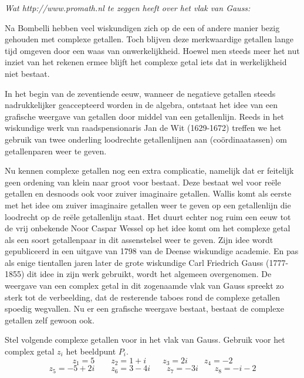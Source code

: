 \documentclass[12pt,twoside,a4]{article}
\begin{document}
\vspace*{1cm}
\begin{mdframed}%
{\em Wat http://www.promath.nl te zeggen heeft over het vlak van Gauss:}

Na Bombelli hebben veel wiskundigen zich op de een of andere manier bezig gehouden met complexe getallen. Toch blijven deze merkwaardige getallen lange tijd omgeven door een waas van onwerkelijkheid. Hoewel men steeds meer het nut inziet van het rekenen ermee blijft het complexe getal iets dat in werkelijkheid niet bestaat.

In het begin van de zeventiende eeuw, wanneer de negatieve getallen steeds nadrukkelijker geaccepteerd worden in de algebra, ontstaat het idee van een grafische weergave van getallen door middel van een getallenlijn. Reeds in het wiskundige werk van raadspensionaris Jan de Wit (1629-1672) treffen we het gebruik van twee onderling loodrechte getallenlijnen aan (coördinaatassen) om getallenparen weer te geven.

Nu kennen complexe getallen nog een extra complicatie, namelijk dat er feitelijk geen ordening van klein naar groot voor bestaat. Deze bestaat wel voor reële getallen en desnoods ook voor zuiver imaginaire getallen. Wallis komt als eerste met het idee om zuiver imaginaire getallen weer te geven op een getallenlijn die loodrecht op de reële getallenlijn staat. Het duurt echter nog ruim een eeuw tot de vrij onbekende Noor Caspar Wessel op het idee komt om het complexe getal als een soort getallenpaar in dit assenstelsel weer te geven. Zijn idee wordt gepubliceerd in een uitgave van 1798 van de Deense wiskundige academie. En pas als enige tientallen jaren later de grote wiskundige Carl Friedrich Gauss (1777-1855) dit idee in zijn werk gebruikt, wordt het algemeen overgenomen. De weergave van een complex getal in dit zogenaamde vlak van Gauss spreekt zo sterk tot de verbeelding, dat de resterende taboes rond de complexe getallen spoedig wegvallen. Nu er een grafische weergave bestaat, bestaat de complexe getallen zelf gewoon ook.
\end{mdframed}


\begin{oefening}
Stel volgende complexe getallen voor in het vlak van Gauss. Gebruik voor het complex getal $z_i$ het beeldpunt $P_i$.
$$z_1=5 \qquad z_2=1+i \qquad  z_3=2i \qquad  z_4=-2$$
$$z_5=-5+2i \qquad  z_6=3-4i \qquad  z_7=-3i \qquad  z_8=-i-2$$
\end{oefening}
\end{document}
